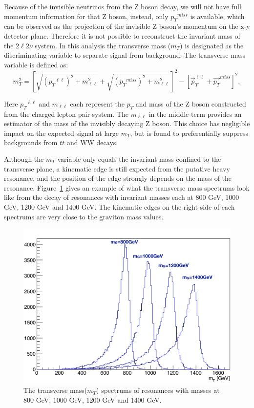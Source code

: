 \vspace{0.3cm}
Because of the invisible neutrinos from the Z boson decay, we will not have full momentum information for that Z boson, instead, only ${p_{T}}^{miss}$ is available, which can be observed as the projection of the invisible Z boson's momentum on the x-y detector plane. Therefore it is not possible to reconstruct the invariant mass of the $2\ell 2\nu$ system. In this analysis the transverse mass ($m_{T}$) is designated as the discriminating variable to separate signal from background. The transverse mass variable is defined as:
\begin{equation}
m_{T}^2 = \left[ \sqrt{({p_{T}}^{\ell\ell})^2 + m^2_{\ell\ell}}
      + \sqrt{({p_{T}}^{miss})^2+m^2_{\ell\ell}}\right]^2
      - \left[\vec{p}_{T}^{\ell\ell}+\vec{p_{T}}^{miss}\right]^2,
\label{eqn:intro_MT}
\end{equation}

Here ${p_{T}}^{\ell\ell}$ and $m_{\ell\ell}$ each represent the $p_{T}$ and mass of the Z boson constructed from the charged lepton pair system. The $m_{\ell\ell}$ in the middle term provides an estimator of the mass of the invisibly decaying Z boson. This choice has negligible impact on the expected signal at large $m_{T}$, but is found to preferentially suppress backgrounds from $t\bar{t}$ and WW decays.

\vspace{0.3cm}
Although the $m_{T}$ variable only equals the invariant mass confined to the transverse plane, a kinematic edge is still expected from the putative heavy resonance, and the position of the edge strongly depends on the mass of the resonance. Figure~\ref{fig:intro_mt} gives an example of what the transverse mass spectrums look like from the decay of resonances with invariant masses each at 800 GeV, 1000 GeV, 1200 GeV and 1400 GeV. The kinematic edges on the right side of each spectrums are very close to the graviton mass values.

\begin{figure}[htbp]
\begin{center}
\includegraphics[width=0.72\linewidth]{figures/intro_example_mt.pdf}
\caption{The transverse mass($m_{T}$) spectrums of resonances with masses at 800 GeV, 1000 GeV, 1200 GeV and 1400 GeV.}
\label{fig:intro_mt}
\end{center}
\end{figure}

